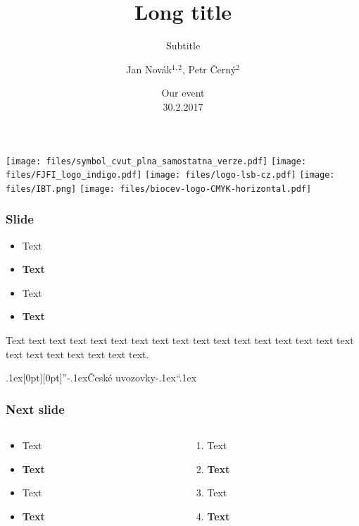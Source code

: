 \documentclass{beamer}
\author[Jan Novák]{Jan Novák$^{1,2}$, Petr Černý$^{2}$}
\institute[affiliation]{$^{1}$ Institute \\  address \\
\vspace{2mm}$^{2}$ Another institute \\  address}
\title[Title]{Long title}
\subtitle{Subtitle}
\date[Event]{Our event\\30.2.2017}
\def\bq{\mbox{\kern.1ex\protect\raisebox{-1.3ex}[0pt][0pt]{''}\kern-.1ex}}
\def\eq{\mbox{\kern-.1ex``\kern.1ex}}
\gdef\uv#1{\bq #1\eq}
\begin{document}
\begin{frame}
	\titlepage
	\begin{center}
  		\texttt{[image: files/symbol\_cvut\_plna\_samostatna\_verze.pdf]}
		\texttt{[image: files/FJFI\_logo\_indigo.pdf]}
		\texttt{[image: files/logo-lsb-cz.pdf]}
		\texttt{[image: files/IBT.png]}
		\texttt{[image: files/biocev-logo-CMYK-horizontal.pdf]}
	\end{center}
\end{frame}





\begin{frame}
	\frametitle{Slide}
\begin{itemize}
	\item Text
	\item \textbf{Text}
    \item \textcolor{cvut_navy}{Text}
    \item \textcolor{cvut_navy}{\textbf{Text}}
\end{itemize}
Text text text text text text text text text text text text text text text text text text text text text text text text.

\uv{České uvozovky}
\end{frame}



\begin{frame}
	\frametitle{Next slide}
	\begin{columns}[onlytextwidth]
		\begin{column}{0.5\textwidth}
			\begin{itemize}
				\item Text
				\item \textbf{Text}
    			\item \textcolor{cvut_navy}{Text}
			    \item \textcolor{cvut_navy}{\textbf{Text}}
			\end{itemize}
		\end{column}

 	 	\begin{column}{0.5\textwidth}
			 \begin{enumerate}
				\item Text
				\item \textbf{Text}
    			\item \textcolor{cvut_navy}{Text}
			    \item \textcolor{cvut_navy}{\textbf{Text}}
			\end{enumerate}
		\end{column}
	\end{columns}
\end{frame}
\end{document}
